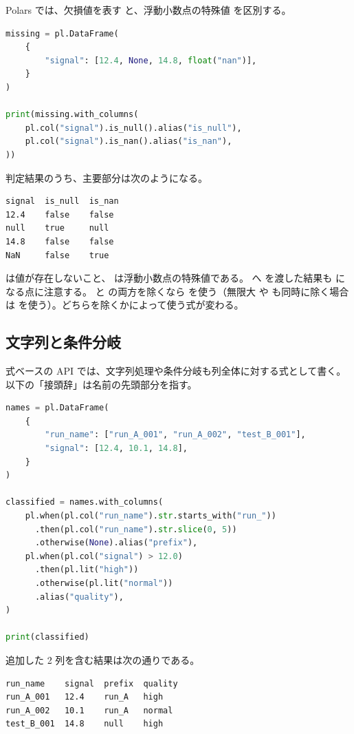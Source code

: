 Polars では、欠損値を表す  と、浮動小数点の特殊値  を区別する。

\begin{lstlisting}[language=Python]
missing = pl.DataFrame(
    {
        "signal": [12.4, None, 14.8, float("nan")],
    }
)

print(missing.with_columns(
    pl.col("signal").is_null().alias("is_null"),
    pl.col("signal").is_nan().alias("is_nan"),
))
\end{lstlisting}

判定結果のうち、主要部分は次のようになる。

\begin{lstlisting}[numbers=none, xleftmargin=2\zw]
signal  is_null  is_nan
12.4    false    false
null    true     null
14.8    false    false
NaN     false    true
\end{lstlisting}

 は値が存在しないこと、 は浮動小数点の特殊値である。 へ  を渡した結果も  になる点に注意する。 と  の両方を除くなら  を使う（無限大  や  も同時に除く場合は  を使う）。どちらを除くかによって使う式が変わる。

\subsection{文字列と条件分岐}

式ベースの API では、文字列処理や条件分岐も列全体に対する式として書く。以下の「接頭辞」は名前の先頭部分を指す。

\begin{lstlisting}[language=Python]
names = pl.DataFrame(
    {
        "run_name": ["run_A_001", "run_A_002", "test_B_001"],
        "signal": [12.4, 10.1, 14.8],
    }
)

classified = names.with_columns(
    pl.when(pl.col("run_name").str.starts_with("run_"))
      .then(pl.col("run_name").str.slice(0, 5))
      .otherwise(None).alias("prefix"),
    pl.when(pl.col("signal") > 12.0)
      .then(pl.lit("high"))
      .otherwise(pl.lit("normal"))
      .alias("quality"),
)

print(classified)
\end{lstlisting}

追加した 2 列を含む結果は次の通りである。

\begin{lstlisting}[numbers=none, xleftmargin=2\zw]
run_name    signal  prefix  quality
run_A_001   12.4    run_A   high
run_A_002   10.1    run_A   normal
test_B_001  14.8    null    high
\end{lstlisting}

